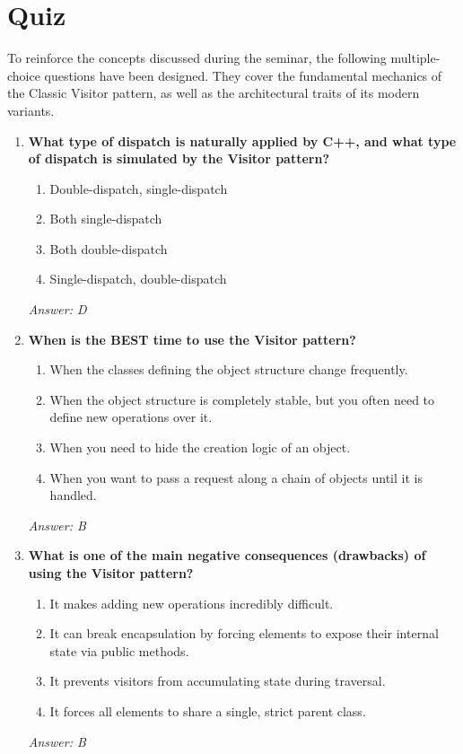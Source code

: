 \section{Quiz}
\label{sec:quiz}

To reinforce the concepts discussed during the seminar, the following multiple-choice questions have been designed. They cover the fundamental mechanics of the Classic Visitor pattern, as well as the architectural traits of its modern variants.

\begin{enumerate}
    \item \textbf{What type of dispatch is naturally applied by C++, and what type of dispatch is simulated by the Visitor pattern?}
    \begin{enumerate}[label=\textbf{\Alph*.}]
        \item Double-dispatch, single-dispatch
        \item Both single-dispatch
        \item Both double-dispatch
        \item Single-dispatch, double-dispatch
    \end{enumerate}
    \textit{Answer: D}

    \item \textbf{When is the BEST time to use the Visitor pattern?}
    \begin{enumerate}[label=\textbf{\Alph*.}]
        \item When the classes defining the object structure change frequently.
        \item When the object structure is completely stable, but you often need to define new operations over it.
        \item When you need to hide the creation logic of an object.
        \item When you want to pass a request along a chain of objects until it is handled.
    \end{enumerate}
    \textit{Answer: B}

    \item \textbf{What is one of the main negative consequences (drawbacks) of using the Visitor pattern?}
    \begin{enumerate}[label=\textbf{\Alph*.}]
        \item It makes adding new operations incredibly difficult.
        \item It can break encapsulation by forcing elements to expose their internal state via public methods.
        \item It prevents visitors from accumulating state during traversal.
        \item It forces all elements to share a single, strict parent class.
    \end{enumerate}
    \textit{Answer: B}
\end{enumerate}


